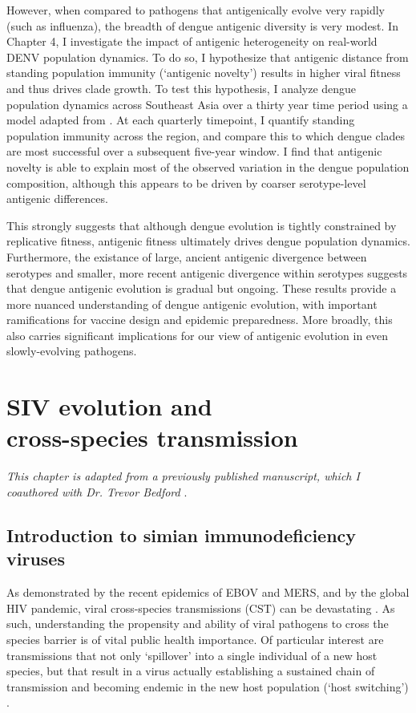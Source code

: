 However, when compared to pathogens that antigenically evolve very rapidly (such as influenza), the breadth of dengue antigenic diversity is very modest.
In Chapter 4, I investigate the impact of antigenic heterogeneity on real-world DENV population dynamics.
To do so, I hypothesize that antigenic distance from standing population immunity (`antigenic novelty') results in higher viral fitness and thus drives clade growth.
To test this hypothesis, I analyze dengue population dynamics across Southeast Asia over a thirty year time period using a model adapted from \citep{luksza2014predictive}.
At each quarterly timepoint, I quantify standing population immunity across the region, and compare this to which dengue clades are most successful over a subsequent five-year window.
I find that antigenic novelty is able to explain most of the observed variation in the dengue population composition, although this appears to be driven by coarser serotype-level antigenic differences.

This strongly suggests that although dengue evolution is tightly constrained by replicative fitness, antigenic fitness ultimately drives dengue population dynamics.
Furthermore, the existance of large, ancient antigenic divergence between serotypes and smaller, more recent antigenic divergence within serotypes suggests that dengue antigenic evolution is gradual but ongoing.
These results provide a more nuanced understanding of dengue antigenic evolution, with important ramifications for vaccine design and epidemic preparedness.
More broadly, this also carries significant implications for our view of antigenic evolution in even slowly-evolving pathogens.

\chapter{SIV evolution and\\cross-species transmission}
\textit{This chapter is adapted from a previously published manuscript, which I coauthored with Dr. Trevor Bedford} \citep{bell2017modern,bell2017thesis}.

\section{Introduction to simian immunodeficiency viruses}
As demonstrated by the recent epidemics of EBOV and MERS, and by the global HIV pandemic, viral cross-species transmissions (CST) can be devastating \citep{morens2008emerging,parrish2008cross}.
As such, understanding the propensity and ability of viral pathogens to cross the species barrier is of vital public health importance.
Of particular interest are transmissions that not only `spillover' into a single individual of a new host species, but that result in a virus actually establishing a sustained chain of transmission and becoming endemic in the new host population (`host switching') \citep{locatelli2012cross}.

